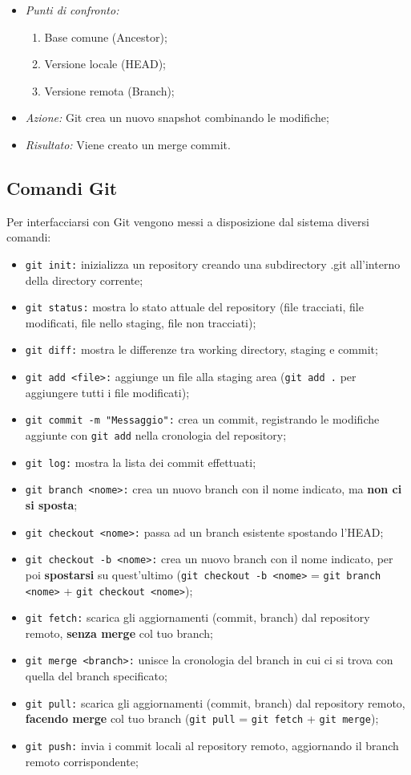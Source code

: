 \documentclass[12pt]{article}
\begin{document}
\begin{itemize}
\begin{itemize}
\item \textit{Punti di confronto:}
\begin{enumerate}
\item Base comune (Ancestor);
\item Versione locale (HEAD);
\item Versione remota (Branch);
\end{enumerate}
\item \textit{Azione:} Git crea un nuovo snapshot combinando le modifiche;
\item \textit{Risultato:} Viene creato un merge commit.
\end{itemize}
\end{itemize}

\subsection{Comandi Git}
Per interfacciarsi con Git vengono messi a disposizione dal sistema diversi comandi:
\begin{itemize}
\item \texttt{git init:} inizializza un repository creando una subdirectory .git all'interno della directory corrente; 
\item \texttt{git status:} mostra lo stato attuale del repository (file tracciati, file modificati, file nello staging, file non tracciati);
\item \texttt{git diff:} mostra le differenze tra working directory, staging e commit;
\item \texttt{git add <file>:} aggiunge un file alla staging area (\texttt{git add .} per aggiungere tutti i file modificati);
\item \texttt{git commit -m "Messaggio":} crea un commit, registrando le modifiche aggiunte con \texttt{git add} nella cronologia del repository;
\item \texttt{git log:} mostra la lista dei commit effettuati;
\item \texttt{git branch <nome>:} crea un nuovo branch con il nome indicato, ma \textbf{non ci si sposta};
\item \texttt{git checkout <nome>:} passa ad un branch esistente spostando l'HEAD;
\item \texttt{git checkout -b <nome>:} crea un nuovo branch con il nome indicato, per poi \textbf{spostarsi} su quest'ultimo (\texttt{git checkout -b <nome>} = \texttt{git branch <nome>} + \texttt{git checkout <nome>});
\item \texttt{git fetch:} scarica gli aggiornamenti (commit, branch) dal repository remoto, \textbf{senza merge} col tuo branch;
\item \texttt{git merge <branch>:} unisce la cronologia del branch in cui ci si trova con quella del branch specificato;
\item \texttt{git pull:} scarica gli aggiornamenti (commit, branch) dal repository remoto, \textbf{facendo merge} col tuo branch (\texttt{git pull} = \texttt{git fetch} + \texttt{git merge});
\item \texttt{git push:} invia i commit locali al repository remoto, aggiornando il branch remoto corrispondente; 
\end{itemize}
\end{document}
